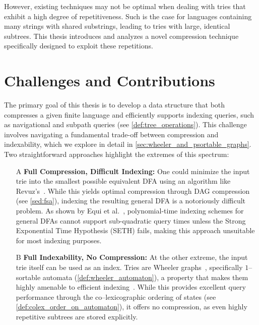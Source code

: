 However, existing techniques may not be optimal when dealing with tries that exhibit a high degree of repetitiveness. Such is the case for languages containing many strings with shared substrings, leading to tries with large, identical subtrees. This thesis introduces and analyzes a novel compression technique specifically designed to exploit these repetitions.

\section{Challenges and Contributions}
The primary goal of this thesis is to develop a data structure that both compresses a given finite language and efficiently supports indexing queries, such as navigational and subpath queries (see \cref{def:tree_operations}). This challenge involves navigating a fundamental trade-off between compression and indexability, which we explore in detail in \cref{sec:wheeler_and_psortable_graphs}. Two straightforward approaches highlight the extremes of this spectrum:

\begin{enumerate}
    \item[A] \textbf{Full Compression, Difficult Indexing:} One could minimize the input trie into the smallest possible equivalent DFA using an algorithm like Revuz's~\cite{revuz1992minimisation}. While this yields optimal compression through DAG compression (see \cref{sed:fsa}), indexing the resulting general DFA is a notoriously difficult problem. As shown by Equi et al.~\cite{equiGraphsCannotBe2023}, polynomial-time indexing schemes for general DFAs cannot support sub-quadratic query times unless the Strong Exponential Time Hypothesis (SETH) fails, making this approach unsuitable for most indexing purposes.
    
    \item[B] \textbf{Full Indexability, No Compression:} At the other extreme, the input trie itself can be used as an index. Tries are Wheeler graphs~\cite{gagie2017wheeler}, specifically $1$--sortable automata (\cref{def:wheeler_automaton}), a property that makes them highly amenable to efficient indexing~\cite{cotumaccio2023co}. While this provides excellent query performance through the co--lexicographic ordering of states (see \cref{def:colex_order_on_automaton}), it offers no compression, as even highly repetitive subtrees are stored explicitly.
\end{enumerate}


